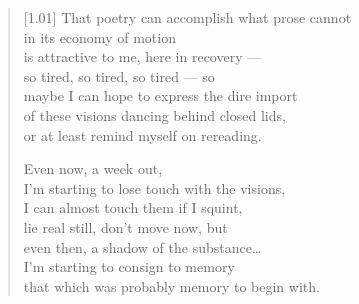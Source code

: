 \begin{verse}[1.01\textwidth]
That poetry can accomplish what prose cannot\\
in its economy of motion\\
is attractive to me, here in recovery ---\\
\vin so tired, so tired, so tired --- so\\
maybe I can hope to express the dire import\\
of these visions dancing behind closed lids,\\
or at least remind myself on rereading.

\newpage

Even now, a week out,\\
I'm starting to lose touch with the visions,\\
I can almost touch them if I squint,\\
\vin lie real still, don't move now, but\\
even then, a shadow of the substance\ldots{}\\
I'm starting to consign to memory\\
that which was probably memory to begin with.
\end{verse}
\newpage

